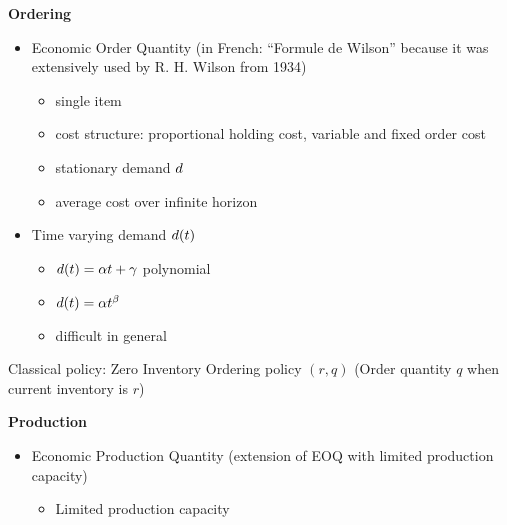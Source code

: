 \medskip

\textbf{Ordering}

\begin{itemize}
  \item \cite{Harris1913} Economic Order Quantity (in French: ``Formule de Wilson'' because it was extensively used by R. H. Wilson from 1934)
  \begin{itemize}
    \item single item
    \item cost structure: proportional holding cost, variable and fixed order cost
    \item stationary demand $d$
    \item average cost over infinite horizon
  \end{itemize}
  \item Time varying demand $d(t)$
  \begin{itemize}
    \item \cite{Resh1976,Donaldson1977} $d(t)=\alpha t+\gamma$ polynomial
    \item \cite{Barbosa1978} $d(t)=\alpha t^{\beta}$
    \item difficult in general
  \end{itemize}
\end{itemize}

Classical policy: Zero Inventory Ordering policy $(r,q)$ (Order quantity $q$ when current inventory is $r$)

\medskip

\textbf{Production}

\begin{itemize}
  \item Economic Production Quantity (extension of EOQ with limited production capacity) \cite{Taft1918}
  \begin{itemize}
    \item Limited production capacity
  \end{itemize}
\end{itemize}


\medskip


\medskip





